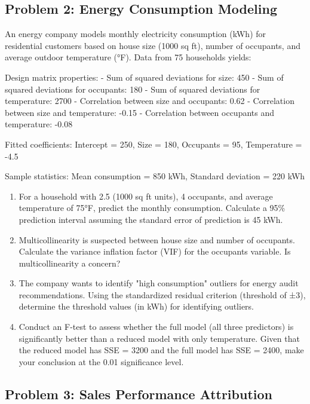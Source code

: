 \documentclass[12pt]{article}
\begin{document}
\subsection*{Problem 2: Energy Consumption Modeling}

An energy company models monthly electricity consumption (kWh) for residential customers based on house size (1000 sq ft), number of occupants, and average outdoor temperature (°F). Data from 75 households yields:

Design matrix properties:
- Sum of squared deviations for size: 450
- Sum of squared deviations for occupants: 180
- Sum of squared deviations for temperature: 2700
- Correlation between size and occupants: 0.62
- Correlation between size and temperature: -0.15
- Correlation between occupants and temperature: -0.08

Fitted coefficients: Intercept = 250, Size = 180, Occupants = 95, Temperature = -4.5

Sample statistics: Mean consumption = 850 kWh, Standard deviation = 220 kWh

\begin{enumerate}[label=(\alph*)]
\item For a household with 2.5 (1000 sq ft units), 4 occupants, and average temperature of 75°F, predict the monthly consumption. Calculate a 95\% prediction interval assuming the standard error of prediction is 45 kWh.

\item Multicollinearity is suspected between house size and number of occupants. Calculate the variance inflation factor (VIF) for the occupants variable. Is multicollinearity a concern?

\item The company wants to identify "high consumption" outliers for energy audit recommendations. Using the standardized residual criterion (threshold of ±3), determine the threshold values (in kWh) for identifying outliers.

\item Conduct an F-test to assess whether the full model (all three predictors) is significantly better than a reduced model with only temperature. Given that the reduced model has SSE = 3200 and the full model has SSE = 2400, make your conclusion at the 0.01 significance level.
\end{enumerate}

\subsection*{Problem 3: Sales Performance Attribution}
\end{document}
